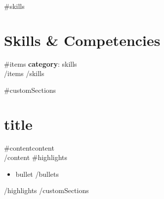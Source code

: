 \documentclass[10pt,letterpaper]{article}
\begin{document}
{{#skills}}
\section{Skills \& Competencies}
{{#items}}
\textbf{{{category}}}: {{skills}} \\
{{/items}}
{{/skills}}

{{#customSections}}
\section{{{title}}}
{{#content}}{{content}} \\{{/content}}
{{#highlights}}
\begin{itemize}[leftmargin=1.5em,noitemsep,topsep=2pt]
{{#bullets}}
    \item {{bullet}}
{{/bullets}}
\end{itemize}
{{/highlights}}
{{/customSections}}
\end{document}
